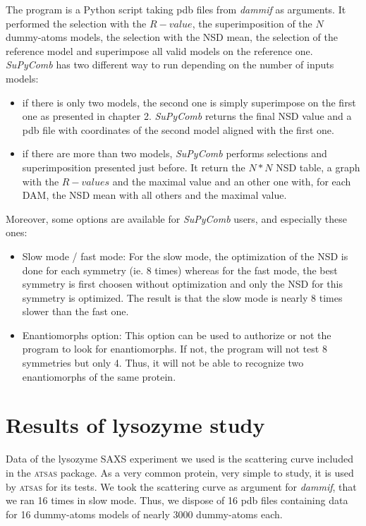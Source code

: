 \documentclass[a4paper, 11pt]{report}
\begin{document}
The program is a Python script taking pdb files from \textit{dammif} 
as arguments. 
It performed the selection with the $R-value$, the superimposition of 
the $N$ dummy-atoms models, the selection with the NSD mean, the 
selection of the reference model and superimpose all valid models on 
the reference one.\\
\textit{SuPyComb} has two different way to run depending on the number 
of inputs models:
\begin{itemize}
  \item if there is only two models, the second one is simply 
        superimpose on the first one as presented in chapter 2.
        \textit{SuPyComb} returns the final NSD value and a pdb file 
        with coordinates of the second model aligned with the first one.
  \item if there are more than two models, \textit{SuPyComb} performs 
        selections and superimposition presented just before. 
        It return the $N*N$ NSD table, a graph with the $R-values$ and 
        the maximal value and an other one with, for each DAM, the NSD 
        mean with all others and the maximal value. 
\end{itemize}
Moreover, some options are available for \textit{SuPyComb} users, and 
especially these ones:
\begin{itemize}
  \item Slow mode / fast mode:
  For the slow mode, the optimization of the NSD is done for each symmetry 
  (ie. 8 times) whereas for the fast mode, the best symmetry is first 
  choosen without optimization and only the NSD for this symmetry is 
  optimized.
  The result is that the slow mode is nearly 8 times slower than the fast 
  one.
  \item Enantiomorphs option:
  This option can be used to authorize or not the program to look for 
  enantiomorphs. 
  If not, the program will not test 8 symmetries but only 4. 
  Thus, it will not be able to recognize two enantiomorphs of the 
  same protein.
\end{itemize}

\section{Results of lysozyme study}%

Data of the lysozyme SAXS experiment we used is the scattering curve 
included in the \textsc{atsas} package. 
As a very common protein, very simple to study, it is used by 
\textsc{atsas} for its tests. 
We took the scattering curve as argument for \textit{dammif}, that we 
ran 16 times in slow mode. 
Thus, we dispose of 16 pdb files containing data for 16 dummy-atoms 
models of nearly 3000 dummy-atoms each.\\
\end{document}
